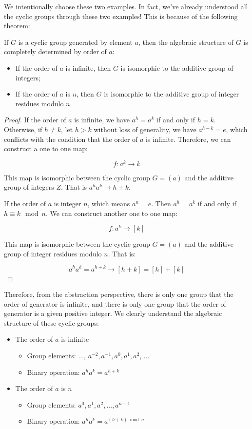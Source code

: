 \documentclass{article}
\begin{document}
We intentionally choose these two examples. In fact, we've already understood all the cyclic groups through these two examples! This is because of the following theorem:

\begin{theorem}
If $G$ is a cyclic group generated by element $a$, then the algebraic structure of $G$ is completely determined by order of $a$:
\begin{itemize}
\item If the order of $a$ is infinite, then $G$ is isomorphic to the additive group of integers;
\item If the order of $a$ is $n$, then $G$ is isomorphic to the additive group of integer residues modulo $n$.
\end{itemize}
\end{theorem}

\begin{proof}
If the order of $a$ is infinite, we have $a^h = a^k$ if and only if $h = k$. Otherwise, if $h \neq k$, let $h > k$ without loss of generality, we have $a^{h - k} = e$, which conflicts with the condition that the order of $a$ is infinite. Therefore, we can construct a one to one map:

\[
f: a^k \to k
\]

This map is isomorphic between the cyclic group $G = (a)$ and the additive group of integers $Z$. That is $a^ha^k \to h + k$.

If the order of $a$ is integer $n$, which means $a^n = e$. Then $a^h = a^k$ if and only if $h \equiv k \mod n$. We can construct another one to one map:

\[
f: a^k \to [k]
\]

This map is isomorphic between the cyclic group $G = (a)$ and the additive group of integer residues modulo $n$. That is:

\[
a^ha^k = a^{h + k} \to [h + k] = [h] + [k]
\]
\end{proof}

Therefore, from the abstraction perspective, there is only one group that the order of generator is infinite, and there is only one group that the order of generator is a given positive integer. We clearly understand the algebraic structure of these cyclic groups:

\begin{itemize}
\item The order of $a$ is infinite
  \begin{itemize}
  \item Group elements: ..., $a^{-2}, a^{-1}, a^0, a^1, a^2$, ...
  \item Binary operation: $a^ha^k = a^{h + k}$
  \end{itemize}
\item The order of $a$ is $n$
  \begin{itemize}
  \item Group elements: $a^0, a^1, a^2, ..., a^{n-1}$
  \item Binary operation: $a^ha^k = a^{(h + k) \bmod n}$
  \end{itemize}
\end{itemize}
\end{document}
